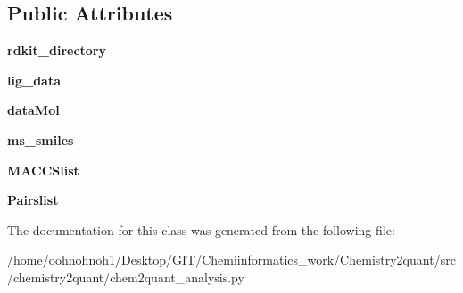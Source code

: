\subsection*{Public Attributes}
\begin{DoxyCompactItemize}
\item 
\mbox{\label{classchemistry2quant_1_1chem2quant__analysis_1_1rdkitProcessDf_a5f4a9d384d3faf2bac4bad875e82e77f}} 
{\bfseries rdkit\+\_\+directory}
\item 
\mbox{\label{classchemistry2quant_1_1chem2quant__analysis_1_1rdkitProcessDf_ac79af2ff958e5f99d853d17dd5b4ca09}} 
{\bfseries lig\+\_\+data}
\item 
\mbox{\label{classchemistry2quant_1_1chem2quant__analysis_1_1rdkitProcessDf_ab9e638e976cd3225c6dff6e0db4b0b06}} 
{\bfseries data\+Mol}
\item 
\mbox{\label{classchemistry2quant_1_1chem2quant__analysis_1_1rdkitProcessDf_a3c29d89aa2b61f7b79e87c9a0ef95114}} 
{\bfseries ms\+\_\+smiles}
\item 
\mbox{\label{classchemistry2quant_1_1chem2quant__analysis_1_1rdkitProcessDf_a837906c95ce51a9632de265d100b5aa6}} 
{\bfseries M\+A\+C\+C\+Slist}
\item 
\mbox{\label{classchemistry2quant_1_1chem2quant__analysis_1_1rdkitProcessDf_a57eaa83e147be2d2d59ca12095452935}} 
{\bfseries Pairslist}
\end{DoxyCompactItemize}


The documentation for this class was generated from the following file\+:\begin{DoxyCompactItemize}
\item 
/home/oohnohnoh1/\+Desktop/\+G\+I\+T/\+Chemiinformatics\+\_\+work/\+Chemistry2quant/src/chemistry2quant/chem2quant\+\_\+analysis.\+py\end{DoxyCompactItemize}
